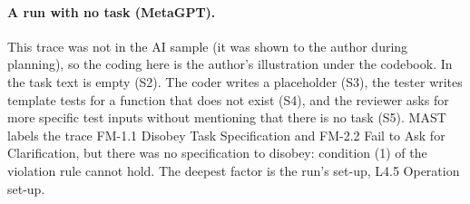\documentclass[11pt]{article}
\begin{document}
\paragraph{A run with no task (MetaGPT).} This trace was not in the AI sample (it
was shown to the author during planning), so the coding here is the author's
illustration under the codebook. In  the
task text is empty (S2). The coder
writes a placeholder (S3), the tester writes template tests for a function that
does not exist (S4), and the reviewer asks for more specific test inputs without
mentioning that there is no task (S5). MAST labels the trace FM-1.1 Disobey Task
Specification and FM-2.2 Fail to Ask for Clarification, but there was no
specification to disobey: condition (1) of the violation rule cannot hold. The
deepest factor is the run's set-up, L4.5 Operation set-up.
\end{document}
